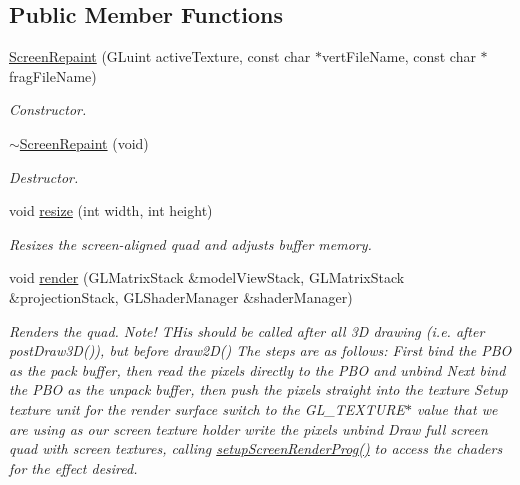 \subsection*{Public Member Functions}
\begin{DoxyCompactItemize}
\item 
\hyperlink{class_screen_repaint_a71bcf622b5c4452b26d2b9f84243bfb1}{Screen\-Repaint} (G\-Luint active\-Texture, const char $\ast$vert\-File\-Name, const char $\ast$frag\-File\-Name)
\begin{DoxyCompactList}\small\item\em Constructor. \end{DoxyCompactList}\item 
\hyperlink{class_screen_repaint_a751c2d2bd1e6134d28f7602957ee140b}{$\sim$\-Screen\-Repaint} (void)
\begin{DoxyCompactList}\small\item\em Destructor. \end{DoxyCompactList}\item 
void \hyperlink{class_screen_repaint_a6aac0dc8f8582386a39f2123e7723271}{resize} (int width, int height)
\begin{DoxyCompactList}\small\item\em Resizes the screen-\/aligned quad and adjusts buffer memory. \end{DoxyCompactList}\item 
void \hyperlink{class_screen_repaint_a2d0707ffbfbfc21f54913437688fa075}{render} (G\-L\-Matrix\-Stack \&model\-View\-Stack, G\-L\-Matrix\-Stack \&projection\-Stack, G\-L\-Shader\-Manager \&shader\-Manager)
\begin{DoxyCompactList}\small\item\em Renders the quad. Note! T\-His should be called {\itshape after\/} all 3\-D drawing (i.\-e. after post\-Draw3\-D()), but {\itshape before\/} draw2\-D() The steps are as follows\-: First bind the P\-B\-O as the pack buffer, then read the pixels directly to the P\-B\-O and unbind Next bind the P\-B\-O as the unpack buffer, then push the pixels straight into the texture Setup texture unit for the render surface switch to the G\-L\-\_\-\-T\-E\-X\-T\-U\-R\-E$\ast$ value that we are using as our screen texture holder write the pixels unbind Draw full screen quad with screen textures, calling \hyperlink{class_screen_repaint_a7b26ae89de772e886010fbbdaee0fbc6}{setup\-Screen\-Render\-Prog()} to access the chaders for the effect desired. \end{DoxyCompactList}\item 

\end{DoxyCompactItemize}
